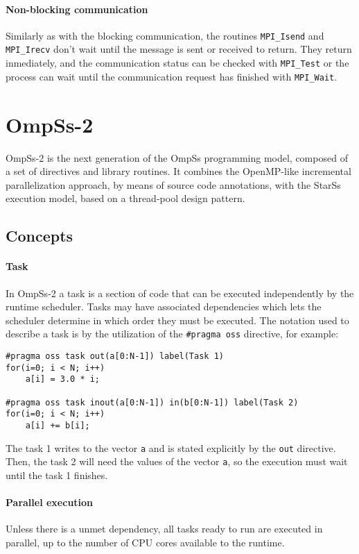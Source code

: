 \paragraph{Non-blocking communication} Similarly as with the blocking
communication, the routines \texttt{MPI\_Isend} and \texttt{MPI\_Irecv} don't
wait until the message is sent or received to return. They return inmediately,
and the communication status can be checked with \texttt{MPI\_Test} or the
process can wait until the communication request has finished with
\texttt{MPI\_Wait}.

\section{OmpSs-2}

OmpSs-2 is the next generation of the OmpSs programming model, composed of a set
of directives and library routines. It combines the OpenMP-like incremental 
parallelization approach, by means of source code annotations, with the StarSs 
execution model, based on a thread-pool design pattern.

\subsection{Concepts}

\paragraph{Task} In OmpSs-2 a task is a section of code that can be executed
independently by the runtime scheduler. Tasks may have associated dependencies
which lets the scheduler determine in which order they must be executed.  The 
notation used to describe a task is by the utilization of the
\texttt{\#pragma oss} directive, for example:
%
\begin{lstlisting}
#pragma oss task out(a[0:N-1]) label(Task 1)
for(i=0; i < N; i++)
	a[i] = 3.0 * i;

#pragma oss task inout(a[0:N-1]) in(b[0:N-1]) label(Task 2)
for(i=0; i < N; i++)
	a[i] += b[i];
\end{lstlisting}
%
The task 1 writes to the vector \texttt{a} and is stated explicitly by the 
\texttt{out} directive. Then, the task 2 will need the values of the vector 
\texttt{a}, so the execution must wait until the task 1 finishes.

\paragraph{Parallel execution} Unless there is a unmet dependency, all tasks 
ready to run are executed in parallel, up to the number of CPU cores available 
to the runtime.

